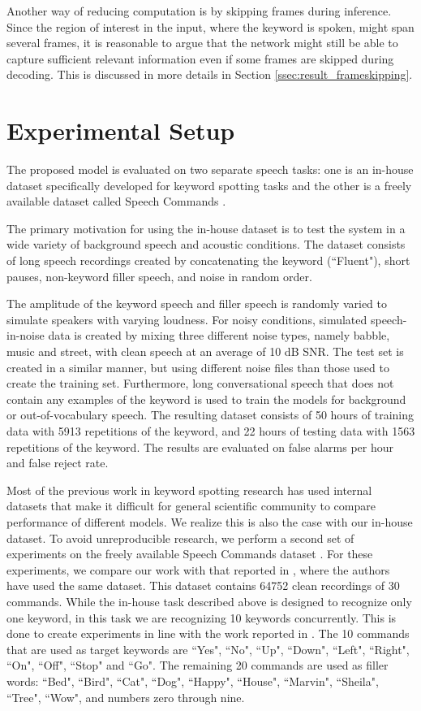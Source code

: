 \documentclass{article}
\begin{document}
Another way of reducing computation is by skipping frames during inference. Since the region of interest in the input, where the keyword is spoken, might span several frames, it is reasonable to argue that the network might still be able to capture sufficient relevant information even if some frames are skipped during decoding. This is discussed in more details in Section \ref{ssec:result_frameskipping}.

\section{Experimental Setup}
\label{sec:experiment}

The proposed model is evaluated on two separate speech tasks: one is an in-house dataset specifically developed for keyword spotting tasks and the other is a freely available dataset called Speech Commands \cite{GSC}. 

The primary motivation for using the in-house dataset is to test the system in a wide variety of background speech and acoustic conditions. The dataset consists of long speech recordings created by concatenating the keyword (``Fluent"), short pauses, non-keyword filler speech, and noise in random order. 

The amplitude of the keyword speech and filler speech is randomly varied to simulate speakers with varying loudness. For noisy conditions, simulated speech-in-noise data is created by mixing three different noise types, namely babble, music and street, with clean speech at an average of 10 dB SNR. The test set is created in a similar manner, but using different noise files than those used to create the training set. Furthermore, long conversational speech that does not contain any examples of the keyword is used to train the models for background or out-of-vocabulary speech. The resulting dataset consists of 50 hours of training data with 5913 repetitions of the keyword, and 22 hours of testing data with 1563 repetitions of the keyword. The results are evaluated on false alarms per hour and false reject rate.   

Most of the previous work in keyword spotting research has used internal datasets that make it difficult for general scientific community to compare performance of different models. We realize this is also the case with our in-house dataset. To avoid unreproducible research, we perform a second set of experiments on the freely available Speech Commands dataset \cite{GSC}. For these experiments, we compare our work with that reported in \cite{Zhang17}, where the authors have used the same dataset. This dataset contains 64752 clean recordings of 30 commands. While the in-house task described above is designed to recognize only one keyword, in this task we are recognizing 10 keywords concurrently. This is done to create experiments in line with the work reported in \cite{Zhang17}. The 10 commands that are used as target keywords are ``Yes", ``No", ``Up", ``Down", ``Left", ``Right", ``On", ``Off", ``Stop" and ``Go". The remaining 20 commands are used as filler words: ``Bed", ``Bird", ``Cat", ``Dog", ``Happy", ``House", ``Marvin", ``Sheila", ``Tree", ``Wow", and numbers zero through nine.
\end{document}
